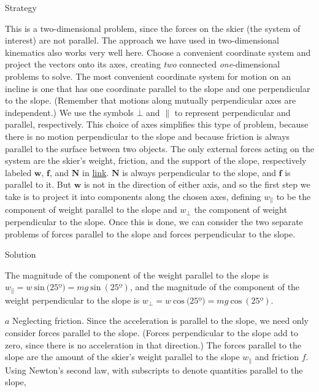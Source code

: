 \documentclass[
]{book}
\newenvironment{tinysection}{}{}
\begin{document}
\begin{tinysection}

{Strategy}

\end{tinysection}

This is a two-dimensional problem, since the forces on the skier (the
system of interest) are not parallel. The approach we have used in
two-dimensional kinematics also works very well here. Choose a
convenient coordinate system and project the vectors onto its axes,
creating \emph{two} connected \emph{one}-dimensional problems to solve. The most
convenient coordinate system for motion on an incline is one that has
one coordinate parallel to the slope and one perpendicular to the slope.
(Remember that motions along mutually perpendicular axes are
independent.) We use the symbols \(\bot{}\) and \(\parallel {}\) to
represent perpendicular and parallel, respectively. This choice of axes
simplifies this type of problem, because there is no motion
perpendicular to the slope and because friction is always parallel to
the surface between two objects. The only external forces acting on the
system are the skier's weight, friction, and the support of the slope,
respectively labeled \(\textbf{w}{}\), \(\textbf{f}{}\), and \(\textbf{N}{}\)
in \protect\hyperlink{import-auto-id2149297}{link}.
\(\textbf{N}{}\)\textbf{} is always perpendicular
to the slope, and \(\textbf{f}{}\)\textbf{} is
parallel to it. But \(\textbf{w}{}\) is not in the direction of either
axis, and so the first step we take is to project it into components
along the chosen axes, defining \(w_{\parallel}\) to be the component of
weight parallel to the slope and \(w_{\bot}{}\) the component of weight
perpendicular to the slope. Once this is done, we can consider the two
separate problems of forces parallel to the slope and forces
perpendicular to the slope.

\begin{tinysection}

{Solution}

\end{tinysection}

The magnitude of the component of the weight parallel to the slope is
\({{w_{\parallel} = \mathit{w}\ }\text{sin}\ (\text{25º}{) = {\mathit{mg}\ }}\text{sin}\ (\text{25º})}{}\),
and the magnitude of the component of the weight perpendicular to the
slope is
\({{w_{\bot} = \mathit{w}\ }\text{cos}\ (\text{25º}{) = {\mathit{mg}\ }}\text{cos}\ (\text{25º})}{}\).

\(a\) Neglecting friction. Since the acceleration is parallel to the
slope, we need only consider forces parallel to the slope. (Forces
perpendicular to the slope add to zero, since there is no acceleration
in that direction.) The forces parallel to the slope are the amount of
the skier's weight parallel to the slope \(w_{\parallel}{}\) and friction
\(f{}\). Using Newton's second law, with subscripts to denote quantities
parallel to the slope,
\end{document}
